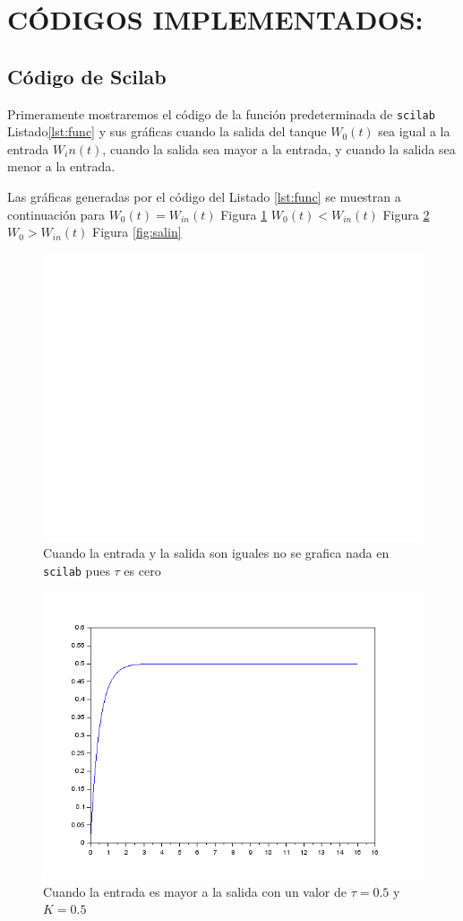 \documentclass[letterpaper,10pt]{article}
\begin{document}
	\section{CÓDIGOS IMPLEMENTADOS:}
	\subsection{Código de Scilab}
	Primeramente mostraremos el código de la función predeterminada de \texttt{scilab} Listado\ref{lst:func} y sus gráficas cuando la salida del tanque $W_0(t)$ sea igual a la entrada $W_in(t)$, cuando la salida sea mayor a la entrada, y cuando la salida sea menor a la entrada.
	 
	 
	 Las gráficas generadas por el código del Listado \ref{lst:func} se muestran a continuación para $W_0(t)=W_{in}(t)$ Figura \ref{fig:iqal} $W_0(t)<W_{in}(t)$ Figura \ref{fig:insal} $W_0>W_{in}(t)$ Figura \ref{fig:salin}
	 \begin{figure}[h!]
	 	\centering
	 	\includegraphics[width=0.5\linewidth]{iqal}
	 	\caption{Cuando la entrada y la salida son iguales no se grafica nada en \texttt{scilab} pues $\tau$ es cero}
	 	\label{fig:iqal}
	 \end{figure}
 \begin{figure}[h!]
 	\centering
 	\includegraphics[width=0.5\linewidth]{insal}
 	\caption{Cuando la entrada es mayor a la salida con un valor de $\tau = 0.5$ y $K= 0.5$}
 	\label{fig:insal}
 \end{figure}
 
\end{document}
